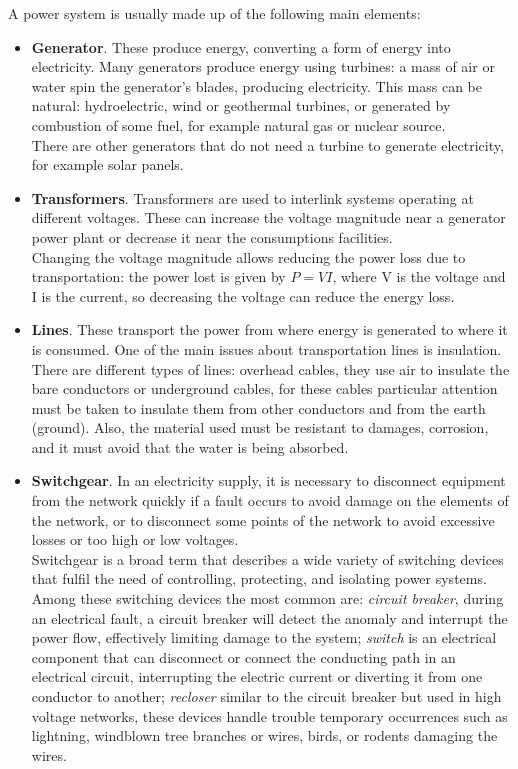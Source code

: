 \noindent A power system is usually made up of the following main elements: \label{networkeledesc}
\begin{itemize}
    \item \textbf{Generator}. These produce energy, converting a form of energy into electricity. Many generators produce energy using turbines: a mass of air or water spin the generator's blades, producing electricity. This mass can be natural: hydroelectric, wind or geothermal turbines, or generated by combustion of some fuel, for example natural gas or nuclear source. \\
    There are other generators that do not need a turbine to generate electricity, for example solar panels.
    \item \textbf{Transformers}. Transformers are used to interlink systems operating at different voltages. These can increase  the voltage magnitude near a generator power plant or decrease it near the consumptions facilities. \\
    Changing the voltage magnitude allows reducing the power loss due to transportation: the power lost is given by $P=VI$, where \gls{V} is the voltage and \gls{I} is the current, so decreasing the voltage can reduce the energy loss.
    \item \textbf{Lines}. These transport the power from where energy is generated to where it is consumed. One of the main issues about transportation lines is insulation. \\
    There are different types of lines: overhead cables, they use air to insulate the bare conductors or underground cables, for these cables particular attention must be taken to insulate them from other conductors and from the earth (ground). Also, the material used must be resistant to damages, corrosion, and it must avoid that the water is being absorbed.
    \item \textbf{Switchgear}. In an electricity supply, it is necessary to disconnect equipment from the network quickly if a fault occurs to avoid damage on the elements of the network, or to disconnect some points of the network to avoid excessive losses or too high or low voltages. \\
    Switchgear is a broad term that describes a wide variety of switching devices that fulfil the need of controlling, protecting, and isolating power systems. Among these switching devices the most common are: \emph{circuit breaker}, during an electrical fault, a circuit breaker will detect the anomaly and interrupt the power flow, effectively limiting damage to the system; \emph{switch} is an electrical component that can disconnect or connect the conducting path in an electrical circuit, interrupting the electric current or diverting it from one conductor to another; \emph{recloser} similar to the circuit breaker but used in high voltage networks, these devices handle trouble temporary occurrences such as lightning, windblown tree branches or wires,
    birds, or rodents damaging the wires.
    

\end{itemize}
